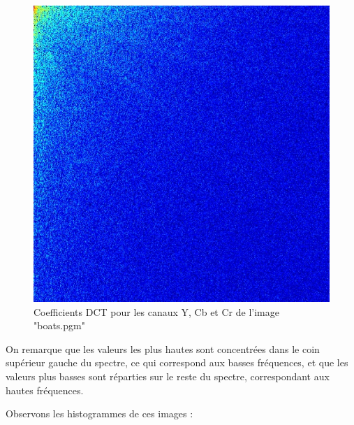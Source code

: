 \documentclass[12pt]{report}
\begin{document}
\begin{figure}[H]
\begin{center}
\includegraphics[scale=0.25]{../ImageRes/dct_2.jpg} 
\caption{Coefficients DCT pour les canaux Y, Cb et Cr de l'image "boats.pgm"}
\end{center}
\end{figure}

On remarque que les valeurs les plus hautes sont concentrées dans le coin supérieur gauche du spectre, ce qui correspond aux basses fréquences, et que les valeurs plus basses sont réparties sur le reste du spectre, correspondant aux hautes fréquences.

Observons les histogrammes de ces images :
\end{document}
